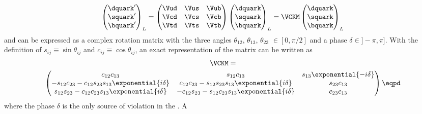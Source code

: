 \begin{equation}
  \begin{pmatrix}
    \dquark^\prime \\
    \squark^\prime \\
    \bquark^\prime \\
  \end{pmatrix}_L
  = 
  \begin{pmatrix}
    \Vud & \Vus & \Vub \\
    \Vcd & \Vcs & \Vcb \\
    \Vtd & \Vts & \Vtb \\
  \end{pmatrix}
  \begin{pmatrix}
    \dquark \\
    \squark \\
    \bquark \\
  \end{pmatrix}_L
  = \VCKM
  \begin{pmatrix}
    \dquark \\
    \squark \\
    \bquark \\
  \end{pmatrix}_L
\end{equation}
%
and can be expressed as a complex rotation matrix with the three angles
$\theta_{12}$, $\theta_{13}$, $\theta_{23}$ $\in {[0, \pi/2]}$ and a phase
$\delta \in {]-\pi, \pi]}$. With the definition of $s_{ij} \equiv \sin
\theta_{ij}$ and $c_{ij} \equiv \cos \theta_{ij}$, an exact representation
\cite{Chau:1984fp} of the \CKM matrix can be written as
%
\begin{multline}
  \VCKM = \\
  \begin{pmatrix}
    c_{12} c_{13}                                                   & s_{12} c_{13}                                                 & s_{13} \exponential{-i\delta} \\
    -s_{12} c_{23} - c_{12} s_{23} s_{13} \exponential{i\delta}     & c_{12} c_{23} - s_{12} s_{23} s_{13} \exponential{i\delta}    & s_{23} c_{13}                 \\
    s_{12} s_{23} - c_{12} c_{23} s_{13} \exponential{i\delta}      & -c_{12} s_{23} - s_{12} c_{23} s_{13} \exponential{i\delta}   & c_{23} c_{13}                 \\
  \end{pmatrix}\eqpd
\end{multline}
%
where the phase $\delta$ is the only source of \CP violation in the \SM. A
